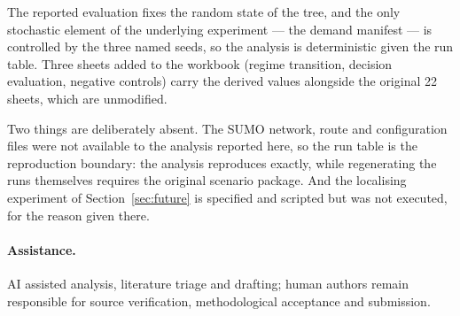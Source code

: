 \documentclass[10pt,a4paper]{article}
\begin{document}
The reported evaluation fixes the random state of the tree, and the only stochastic element of the underlying experiment --- the demand manifest --- is controlled by the three named seeds, so the analysis is deterministic given the run table. Three sheets added to the workbook (regime transition, decision evaluation, negative controls) carry the derived values alongside the original 22 sheets, which are unmodified.

Two things are deliberately absent. The SUMO network, route and configuration files were not available to the analysis reported here, so the run table is the reproduction boundary: the analysis reproduces exactly, while regenerating the runs themselves requires the original scenario package. And the localising experiment of Section~\ref{sec:future} is specified and scripted but was not executed, for the reason given there.

\paragraph{Assistance.} AI assisted analysis, literature triage and drafting; human authors remain responsible for source verification, methodological acceptance and submission.
\end{document}
